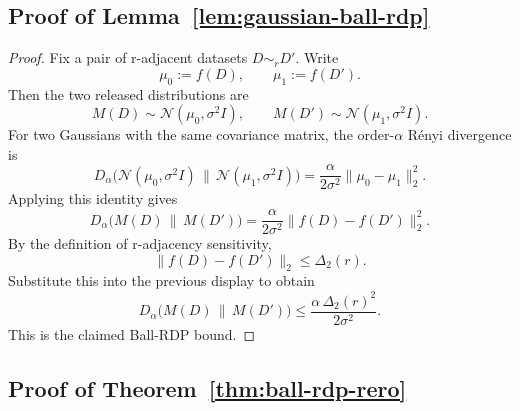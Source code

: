 \documentclass[11pt,a4paper]{report}
\theoremstyle{plain}
\theoremstyle{definition}
\theoremstyle{remark}
\begin{document}
\subsection{Proof of Lemma~\ref{lem:gaussian-ball-rdp}}

\begin{proof}
Fix a pair of r-adjacent datasets $D\sim_r D'$. Write
\[
\mu_0:=f(D),
\qquad
\mu_1:=f(D').
\]
Then the two released distributions are
\[
M(D)\sim \mathcal{N}(\mu_0,\sigma^2 I),
\qquad
M(D')\sim \mathcal{N}(\mu_1,\sigma^2 I).
\]
For two Gaussians with the same covariance matrix, the order-$\alpha$ Rényi divergence is
\[
D_\alpha\big(\mathcal{N}(\mu_0,\sigma^2 I)\,\|\,\mathcal{N}(\mu_1,\sigma^2 I)\big)
=
\frac{\alpha}{2\sigma^2}\|\mu_0-\mu_1\|_2^2.
\]
Applying this identity gives
\[
D_\alpha\big(M(D)\,\|\,M(D')\big)
=
\frac{\alpha}{2\sigma^2}\|f(D)-f(D')\|_2^2.
\]
By the definition of r-adjacency sensitivity,
\[
\|f(D)-f(D')\|_2\le \Delta_2(r).
\]
Substitute this into the previous display to obtain
\[
D_\alpha\big(M(D)\,\|\,M(D')\big)
\le
\frac{\alpha\,\Delta_2(r)^2}{2\sigma^2}.
\]
This is the claimed Ball-RDP bound.
\end{proof}

\subsection{Proof of Theorem~\ref{thm:ball-rdp-rero}}
\end{document}
